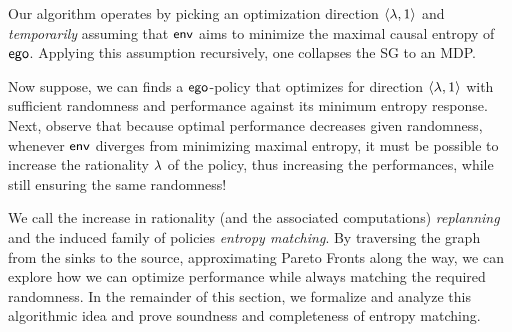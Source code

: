 Our algorithm operates by picking an optimization direction
$\langle \lambda, 1 \rangle$ and \emph{temporarily} assuming that $\mathsf{env}$ aims
to minimize the maximal causal entropy of $\mathsf{ego}$. Applying this assumption recursively, one collapses the SG to an MDP.

Now suppose, we can finds a $\mathsf{ego}$-policy that optimizes for
direction $\langle \lambda, 1\rangle$ with sufficient randomness and
performance against its minimum entropy response.  Next, observe that
because optimal performance decreases given randomness, whenever
$\mathsf{env}$ diverges from minimizing maximal entropy, it must be possible
to increase the rationality $\lambda$ of the policy, thus increasing the
performances, while still ensuring the same randomness!

We call the increase in rationality (and the associated computations)
\emph{replanning} and the induced family of policies \emph{entropy
  matching}.  By traversing the graph from the sinks to the source,
approximating Pareto Fronts along the way, we can explore how we can
optimize performance while always matching the required randomness.
In the remainder of this section, we formalize and analyze this
algorithmic idea and prove soundness and completeness of entropy
matching.


